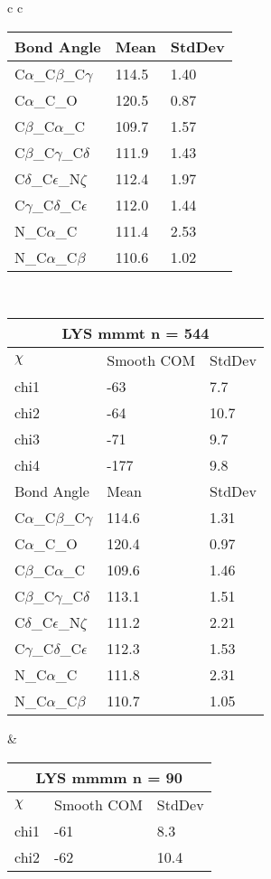 \begin{longtable}{ c c }
\begin{tabular}{ l l l }
  Bond Angle   & Mean     & StdDev \\ \midrule
  C$\alpha$\_C$\beta$\_C$\gamma$ & 114.5 & 1.40\\
  C$\alpha$\_C\_O & 120.5 & 0.87\\
  C$\beta$\_C$\alpha$\_C & 109.7 & 1.57\\
  C$\beta$\_C$\gamma$\_C$\delta$ & 111.9 & 1.43\\
  C$\delta$\_C$\epsilon$\_N$\zeta$ & 112.4 & 1.97\\
  C$\gamma$\_C$\delta$\_C$\epsilon$ & 112.0 & 1.44\\
  N\_C$\alpha$\_C & 111.4 & 2.53\\
  N\_C$\alpha$\_C$\beta$ & 110.6 & 1.02\\
  \bottomrule
  \end{tabular}
  \\
  \begin{tabular}{ l l l }
  \toprule
  \multicolumn{3}{c}{LYS \textbf{mmmt} n = 544} \\ \toprule
  $\chi$       & Smooth COM & StdDev \\ \midrule
  chi1 & -63 & 7.7 \\ 
  chi2 & -64 & 10.7 \\ 
  chi3 & -71 & 9.7 \\ 
  chi4 & -177 & 9.8 \\ \midrule
  Bond Angle   & Mean     & StdDev \\ \midrule
  C$\alpha$\_C$\beta$\_C$\gamma$ & 114.6 & 1.31\\
  C$\alpha$\_C\_O & 120.4 & 0.97\\
  C$\beta$\_C$\alpha$\_C & 109.6 & 1.46\\
  C$\beta$\_C$\gamma$\_C$\delta$ & 113.1 & 1.51\\
  C$\delta$\_C$\epsilon$\_N$\zeta$ & 111.2 & 2.21\\
  C$\gamma$\_C$\delta$\_C$\epsilon$ & 112.3 & 1.53\\
  N\_C$\alpha$\_C & 111.8 & 2.31\\
  N\_C$\alpha$\_C$\beta$ & 110.7 & 1.05\\
  \bottomrule
  \end{tabular}
  &
  \begin{tabular}{ l l l }
  \toprule
  \multicolumn{3}{c}{LYS \textbf{mmmm} n = 90} \\ \toprule
  $\chi$       & Smooth COM & StdDev \\ \midrule
  chi1 & -61 & 8.3 \\ 
  chi2 & -62 & 10.4 \\ 

\end{tabular}
\end{longtable}
